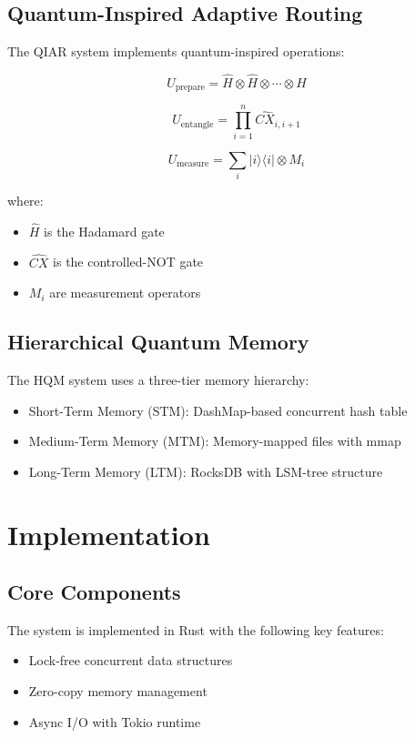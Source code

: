 \documentclass[10pt,twocolumn]{article}
\begin{document}
\subsection{Quantum-Inspired Adaptive Routing}
The QIAR system implements quantum-inspired operations:

\begin{equation}
    U_{\text{prepare}} = \hat{H} \otimes \hat{H} \otimes \cdots \otimes \hat{H}
\end{equation}

\begin{equation}
    U_{\text{entangle}} = \prod_{i=1}^n \hat{CX}_{i,i+1}
\end{equation}

\begin{equation}
    U_{\text{measure}} = \sum_i |i\rangle\langle i| \otimes M_i
\end{equation}

where:
\begin{itemize}
    \item $\hat{H}$ is the Hadamard gate
    \item $\hat{CX}$ is the controlled-NOT gate
    \item $M_i$ are measurement operators
\end{itemize}

\subsection{Hierarchical Quantum Memory}
The HQM system uses a three-tier memory hierarchy:
\begin{itemize}
    \item Short-Term Memory (STM): DashMap-based concurrent hash table
    \item Medium-Term Memory (MTM): Memory-mapped files with mmap
    \item Long-Term Memory (LTM): RocksDB with LSM-tree structure
\end{itemize}

\section{Implementation}
\subsection{Core Components}
The system is implemented in Rust with the following key features:
\begin{itemize}
    \item Lock-free concurrent data structures
    \item Zero-copy memory management
    \item Async I/O with Tokio runtime
\end{itemize}
\end{document}
